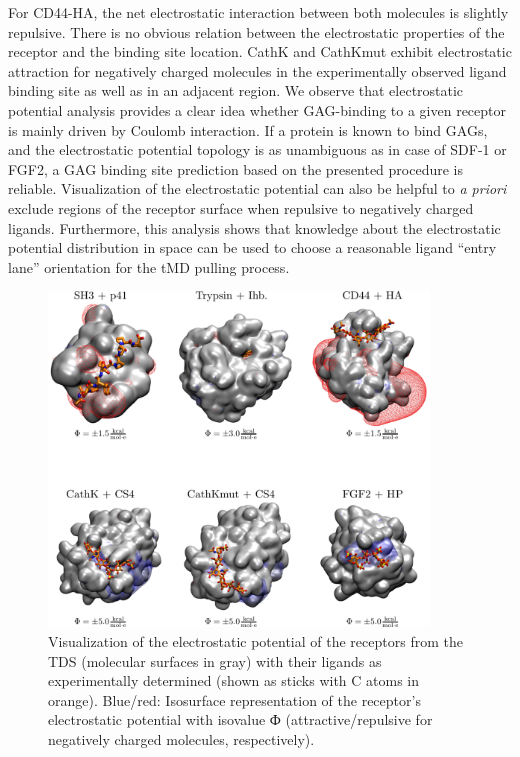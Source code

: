  For
CD44-HA, the net electrostatic interaction between both molecules is slightly
repulsive. There is no obvious relation between the electrostatic properties of
the receptor and the binding site location. CathK and CathKmut exhibit
electrostatic attraction for negatively charged molecules in the experimentally
observed ligand binding site as well as in an adjacent region. We observe that
electrostatic potential analysis provides a clear idea whether GAG-binding to a
given receptor is mainly driven by Coulomb interaction. If a protein is known to
bind GAGs, and the electrostatic potential topology is as unambiguous as in case
of SDF-1 or FGF2, a GAG binding site prediction based on the presented procedure
is reliable. Visualization of the electrostatic potential can also be helpful to
\textit{a priori} exclude regions of the receptor surface when repulsive to
negatively charged ligands. Furthermore, this analysis shows that knowledge
about the electrostatic potential distribution in space can be used to choose a
reasonable ligand \enquote{entry lane} orientation for the tMD pulling process.


\begin{figure}
\centering
\includegraphics[width=0.9\textwidth]{gfx/bspred/suppl_figure_estatic_distributions_004_1200.png}
\caption[]{
Visualization of the electrostatic potential of the receptors from the TDS
(molecular surfaces in gray) with their ligands as experimentally determined
(shown as sticks with C atoms in orange). Blue/red: Isosurface representation of
the receptor's electrostatic potential with isovalue Ф (attractive/repulsive for
negatively charged molecules, respectively).
}
\label{fig:bspred:various_estatic}
\end{figure}


